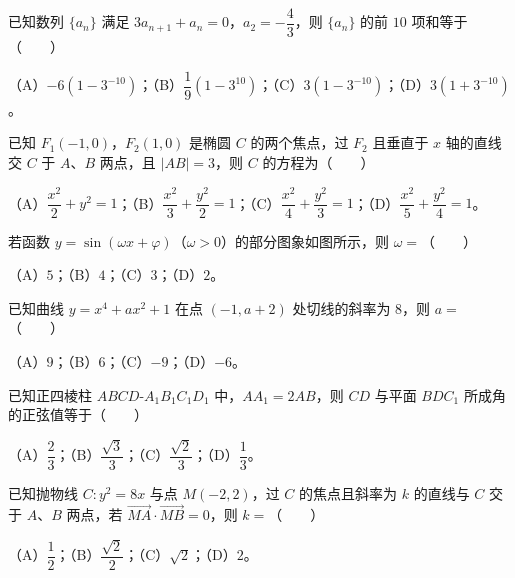 \begin{question}
已知数列 $\{a_n\}$ 满足 $3a_{n+1}+a_n=0$，$a_2=-\dfrac43$，则 $\{a_n\}$ 的前 $10$ 项和等于\mbox{（　　）}

（A）$-6(1-3^{-10})$；（B）$\dfrac19(1-3^{10})$；（C）$3(1-3^{-10})$；（D）$3(1+3^{-10})$。

\end{question}
\begin{question}
已知 $F_1(-1,0)$，$F_2(1,0)$ 是椭圆 $C$ 的两个焦点，过 $F_2$ 且垂直于 $x$ 轴的直线交 $C$ 于 $A$、$B$ 两点，且 $|AB|=3$，则 $C$ 的方程为\mbox{（　　）}

（A）$\dfrac{x^2}2+y^2=1$；（B）$\dfrac{x^2}3+\dfrac{y^2}2=1$；（C）$\dfrac{x^2}4+\dfrac{y^2}3=1$；（D）$\dfrac{x^2}5+\dfrac{y^2}4=1$。

\Needspace{0.4\textheight}
\end{question}
\begin{question}
若函数 $y=\sin(\omega x+\varphi)$（$\omega>0$）的部分图象如图所示，则 $\omega=$\mbox{（　　）}
\nopagebreak[4]
\begin{center}\end{center}
\nopagebreak[4]
（A）$5$；（B）$4$；（C）$3$；（D）$2$。

\end{question}
\begin{question}
已知曲线 $y=x^4+ax^2+1$ 在点 $(-1,a+2)$ 处切线的斜率为 $8$，则 $a=$\mbox{（　　）}

（A）$9$；（B）$6$；（C）$-9$；（D）$-6$。

\end{question}
\begin{question}
已知正四棱柱 $ABCD\text{-}A_1B_1C_1D_1$ 中，$AA_1=2AB$，则 $CD$ 与平面 $BDC_1$ 所成角的正弦值等于\mbox{（　　）}

（A）$\dfrac23$；（B）$\dfrac{\sqrt3}3$；（C）$\dfrac{\sqrt2}3$；（D）$\dfrac13$。

\end{question}
\begin{question}
已知抛物线 $C:y^2=8x$ 与点 $M(-2,2)$，过 $C$ 的焦点且斜率为 $k$ 的直线与 $C$ 交于 $A$、$B$ 两点，若 $\overrightarrow{MA}\cdot\overrightarrow{MB}=0$，则 $k=$\mbox{（　　）}

（A）$\dfrac12$；（B）$\dfrac{\sqrt2}2$；（C）$\sqrt2$；（D）$2$。

\end{question}

